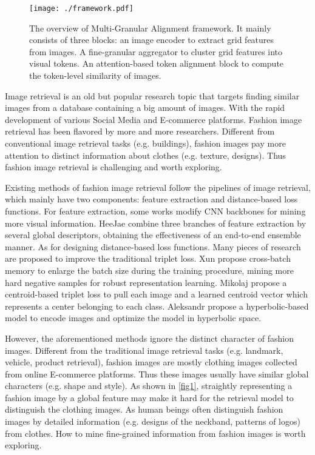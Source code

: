 \documentclass[10pt,twocolumn,letterpaper]{article}
\begin{document}
\begin{figure*}
    \centering
    \texttt{[image: ./framework.pdf]}
    \caption{The overview of Multi-Granular Alignment framework. It mainly consists of three blocks: an image encoder to extract grid features from images. A fine-granular aggregator to cluster grid features into visual tokens. An attention-based token alignment block to compute the token-level similarity of images.}
    \label{fig2}
\end{figure*}

\label{sec:intro}
Image retrieval is an old but popular research topic that targets finding similar images from a database containing a big amount of images. With the rapid development of various Social Media and E-commerce platforms. Fashion image retrieval \cite{deepfashion} has been flavored by more and more researchers. Different from conventional image retrieval tasks (e.g. buildings), fashion images pay more attention to distinct information about clothes (e.g. texture, designs). Thus fashion image retrieval is challenging and worth exploring. 
\par Existing methods \cite{ctl, rst, grnet, hyp-vit, proxy-anchor, proxynca++, itir, nsoftmax, heejae, xbm} of fashion image retrieval follow the pipelines of image retrieval, which mainly have two components: feature extraction and distance-based loss functions. For feature extraction, some works modify CNN backbones for mining more visual information. HeeJae \etal \cite{heejae} combine three branches of feature extraction by several global descriptors, obtaining the effectiveness of an end-to-end ensemble manner. As for designing distance-based loss functions. Many pieces of research are proposed to improve the traditional triplet loss. Xun \etal \cite{xbm} propose cross-batch memory to enlarge the batch size during the training procedure, mining more hard negative samples for robust representation learning. Mikolaj \etal \cite{ctl} propose a centroid-based triplet loss to pull each image and a learned centroid vector which represents a center belonging to each class. Aleksandr \etal \cite{hyp-vit} propose a hyperbolic-based model to encode images and optimize the model in hyperbolic space. 
\par However, the aforementioned methods ignore the distinct character of fashion images. Different from the traditional image retrieval tasks (e.g. landmark, vehicle, product retrieval), fashion images are mostly clothing images collected from online E-commerce platforms. Thus these images usually have similar global characters (e.g. shape and style). As shown in \cref{fig1}, straightly representing a fashion image by a global feature may make it hard for the retrieval model to distinguish the clothing images. As human beings often distinguish fashion images by detailed information (e.g. designs of the neckband, patterns of logos) from clothes. How to mine fine-grained information from fashion images is worth exploring. 
\end{document}
